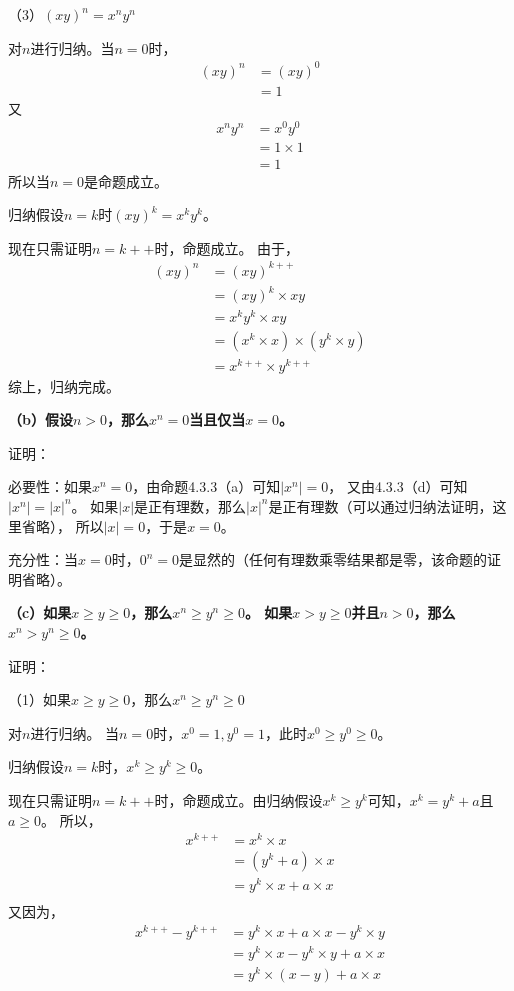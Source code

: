 \documentclass{article}
\theoremstyle{mystyle}
\begin{document}
（3）$(xy)^n = x^n y^n$

对$n$进行归纳。当$n=0$时，
\begin{align*}
  (xy)^n & = (xy)^0 \\
         & = 1
\end{align*}
又
\begin{align*}
  x^n y^n & = x^0 y^0    \\
          & = 1 \times 1 \\
          & = 1
\end{align*}
所以当$n=0$是命题成立。

归纳假设$n=k$时$(xy)^k = x^k y^k$。

现在只需证明$n=k++$时，命题成立。
由于，
\begin{align*}
  (xy)^n & =(xy)^{k++}                            \\
         & = (xy)^k \times xy                     \\
         & = x^k y^k \times xy                    \\
         & = (x^k \times x) \times (y^k \times y) \\
         & = x^{k++} \times y^{k++}
\end{align*}
综上，归纳完成。

\textbf{（b）假设$n>0$，那么$x^n = 0$当且仅当$x=0$。}

证明：

必要性：如果$x^n=0$，由命题4.3.3（a）可知$|x^n|=0$，
又由4.3.3（d）可知$|x^n|=|x|^n$。
如果$|x|$是正有理数，那么$|x|^n$是正有理数（可以通过归纳法证明，这里省略），
所以$|x|=0$，于是$x=0$。

充分性：当$x=0$时，$0^n=0$是显然的（任何有理数乘零结果都是零，该命题的证明省略）。

\textbf{（c）如果$x \geq y \geq 0$，那么$x^n \geq y^n \geq 0$。
  如果$x > y \geq 0$并且$n > 0$，那么$x^n > y^n \geq 0$。}

证明：

（1）如果$x \geq y \geq 0$，那么$x^n \geq y^n \geq 0$

对$n$进行归纳。
当$n=0$时，$x^0=1,y^0=1$，此时$x^0 \geq y^0 \geq 0$。

归纳假设$n=k$时，$x^k \geq y^k \geq 0$。

现在只需证明$n=k++$时，命题成立。由归纳假设$x^k \geq y^k$可知，$x^k = y^k + a$且$a \geq 0$。
所以，
\begin{align*}
  x^{k++} & = x^k \times x              \\
          & = (y^k + a) \times x        \\
          & = y^k \times x + a \times x \\
\end{align*}
又因为，
\begin{align*}
  x^{k++} - y^{k++} & = y^k \times x + a \times x - y^k \times y \\
                    & = y^k \times x - y^k \times y + a \times x \\
                    & = y^k \times (x - y) + a \times x          \\
\end{align*}
\end{document}

